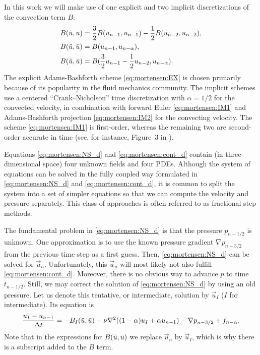 In this work we will make use of one explicit and two implicit
discretizations of the convection term $B$:
\begin{align}
\label{eq:mortensen:EX}
B(\tilde{\vec{u}},\Bar{\vec{u}}) &=
\frac{3}{2}B(\vec{u}_{n-1},\vec{u}_{n-1})-
\frac{1}{2}B(\vec{u}_{n-2},\vec{u}_{n-2}),
\\
\label{eq:mortensen:IM1}
B(\tilde{\vec{u}},\Bar{\vec{u}}) &=
B(\vec{u}_{n-1},\vec{u}_{n-\alpha}),
\\
 \label{eq:mortensen:IM2}
B(\tilde{\vec{u}},\Bar{\vec{u}}) &=
B(\frac{3}{2}\vec{u}_{n-1}-\frac{1}{2}\vec{u}_{n-2},\vec{u}_{n-\alpha}).
\end{align}
The explicit Adams-Bashforth
scheme \eqref{eq:mortensen:EX} is chosen primarily because
of its popularity in the fluid mechanics community. The implicit
schemes use a centered ``Crank--Nicholson'' time discretization
with $\alpha=1/2$ for the convected velocity, in combination with
forward Euler \eqref{eq:mortensen:IM1} and Adams-Bashforth projection
\eqref{eq:mortensen:IM2} for the convecting velocity.
The scheme \eqref{eq:mortensen:IM1} is first-order, whereas the
remaining two are second-order accurate in time (see, for instance,
Figure~3 in \citet{SimoArmero1994}).

Equations \eqref{eq:mortensen:NS_d} and \eqref{eq:mortensen:cont_d}
contain (in three-dimensional space) four unknown fields and four PDEs.
Although the system of equations can be solved in the fully coupled way
formulated in \eqref{eq:mortensen:NS_d} and \eqref{eq:mortensen:cont_d},
it is common to split the system into a set of simpler equations so
that we can compute the velocity and pressure separately.  This class
of approaches is often referred to as fractional step methods.

The fundamental problem in \eqref{eq:mortensen:NS_d} is that the
pressure $p_{n-1/2}$ is unknown. One approximation is to use the
known pressure gradient $\nabla p_{n-3/2}$ from the previous time step
as a first guess. Then, \eqref{eq:mortensen:NS_d} can be solved for
$\vec{u}_n$. Unfortunately, this $\vec{u}_n$ will most likely not also
fulfill \eqref{eq:mortensen:cont_d}. Moreover, there is no obvious way
to advance $p$ to time $t_{n-1/2}$. Still, we may correct the solution
of \eqref{eq:mortensen:NS_d} by using an old pressure. Let us denote
this tentative, or intermediate, solution by $\vec{u}_I$ ($I$ for
intermediate). Its equation is
\begin{equation}
\label{eq:mortensen:NS_FS}
\frac{{\vec{u}}_{I}-\vec{u}_{n-1}}{\Delta t} =
- B_I(\tilde{\vec{u}},\Bar{\vec{u}}) +
\nu \nabla^2 ((1-\alpha) {\vec{u}}_{I} + \alpha \vec{u}_{n-1})
-\nabla p_{n-3/2} + f_{n-\alpha}.
\end{equation}
Note that in the expressions for $B(\tilde{\vec{u}},\Bar{\vec{u}})$ we
replace $\vec{u}_n$ by $\vec{u}_I$, which is why there is a subscript
added to the $B$ term.

